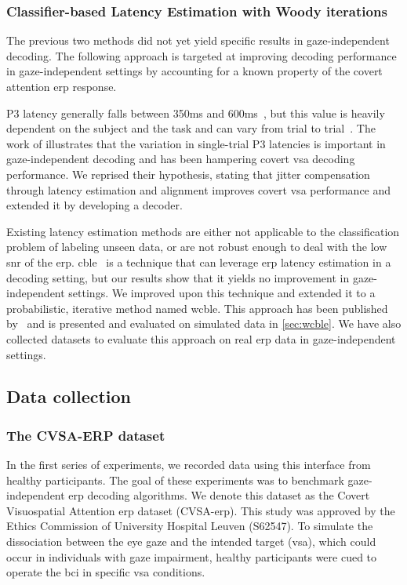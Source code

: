 \subsubsection{Classifier-based Latency Estimation with Woody iterations}

The previous two methods did not yet yield specific results in gaze-independent
decoding.
The following approach is targeted at improving decoding performance in
gaze-independent settings by accounting for a known property of the covert
attention \ac{erp} response.

P3 latency generally falls between 350ms and 600ms~\cite{Luck2014}, but this
value is heavily dependent on the subject and the task and can vary from trial
to trial~\cite{Ouyang2017}.
The work of \cite{Arico2014} illustrates that the variation in single-trial P3
latencies is important in gaze-independent decoding and has been hampering covert
\ac{vsa} decoding performance.
We reprised their hypothesis, stating that jitter compensation through latency
estimation and alignment improves
covert \ac{vsa} performance and extended it by developing a decoder.

Existing latency estimation methods are either not applicable to the
classification problem of labeling unseen data, or are not robust enough to
deal with the low \ac{snr} of the \ac{erp}.
\Ac{cble}~\cite{Mowla2017} is a technique that can leverage
\ac{erp} latency estimation in a decoding setting, but our results show that it
yields no improvement in gaze-independent settings.
We improved upon this technique and extended it to a probabilistic, iterative
method named \ac{wcble}.
This approach has been published by~\textcite{VanDenKerchove2024} and is presented
and evaluated on simulated data in \cref{sec:wcble}.
We have also collected datasets to evaluate this approach on real \ac{erp} data
in gaze-independent settings.

\subsection{Data collection}

\subsubsection{The CVSA-ERP dataset}
\label{sec:gaze-independence/approach/cvsa-erp}

In the first series of experiments, we recorded data using this interface from healthy participants.
The goal of these experiments was to benchmark
gaze-independent \ac{erp} decoding algorithms.
We denote this dataset as the Covert Visuospatial Attention \ac{erp} dataset
(CVSA-\ac{erp}).
This study was approved by the Ethics Commission of University Hospital Leuven
(S62547).
To simulate the dissociation between the eye gaze and the
intended target (\ac{vsa}), which could occur in individuals with gaze
impairment, healthy participants were cued to operate the \ac{bci} in specific
\ac{vsa} conditions.


